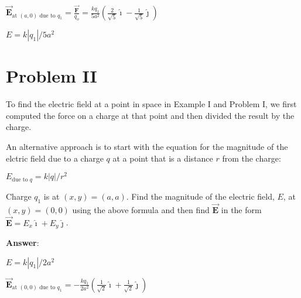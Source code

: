 \documentclass{article}
\newcommand{\ds}[0]{\displaystyle}
\newcommand{\ihat}[0]{\hat{\boldsymbol{\imath}}}
\newcommand{\jhat}[0]{\hat{\boldsymbol{\jmath}}}
\newcommand{\bfvec}[1]{\vec{\mathbf{#1}}}
\begin{document}
$\ds\bfvec{E}_{\text{at }(a,0) \text{ due to }q_1} = \frac{\bfvec{F}}{q_o}=\frac{kq_1}{5a^2}\left(\frac{2}{\sqrt{5}}\ihat -\frac{1}{\sqrt{5}}\jhat\right)$

$E = k|q_1|/5a^2$
\else


\fi

\newpage

\section{Problem II}

To find the electric field at a point in space in Example I and Problem I, we first computed the force on a charge at that point and then divided the result by the charge.

An alternative approach is to start with the equation for the magnitude of the elctric field due to a charge $q$ at a point that is a distance $r$ from the charge:

$E_{\text{due to }q}=k{|q|}/{r^2}$

Charge $q_1$ is at $(x,y)=(a, a)$. Find the magnitude of the electric field, $E$, at $(x,y)=(0, 0)$ using the above formula and then find $\bfvec{E}$ in the form $\bfvec{E}=E_x\ihat + E_y\jhat$.

\ifsolutions
{\bf Answer}:

$E = k|q_1|/2a^2$

$\ds\bfvec{E}_{\text{at }(0,0) \text{ due to }q_1}=-\frac{kq_1}{2a^2}\left(\frac{1}{\sqrt{2}}\ihat +\frac{1}{\sqrt{2}}\jhat\right)$
\else


\fi
\end{document}
